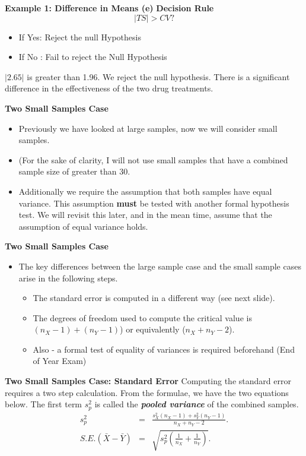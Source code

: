 \documentclass[a4]{beamer}
\begin{document}
\noindent \textbf{Example 1: Difference in Means (e) }
\textbf{Decision Rule}
\[ |TS| > CV ?  \]
\begin{itemize}
\item If Yes: Reject the null Hypothesis
\item If No : Fail to reject the Null Hypothesis
\end{itemize}
$|2.65|$ is greater than 1.96. We reject the null hypothesis. There is a significant difference in the effectiveness of the two drug treatments.






\noindent \textbf{Two Small Samples Case}
\begin{itemize}
\item Previously we have looked at large samples, now we will consider small samples.
\item (For the sake of clarity, I will not use small samples that have a combined sample size of greater than 30.
\item Additionally we require the assumption that both samples have equal variance. This assumption \textbf{must} be tested with another formal hypothesis test. We will revisit this later, and in the mean time, assume that the assumption of equal variance holds.
\end{itemize}



\noindent \textbf{Two Small Samples Case}
\begin{itemize}
\item The key differences between the large sample case and the small sample cases arise in the following steps.
    \begin{itemize}
    \item The standard error is computed in a different way (see next slide).
    \item The degrees of freedom used to compute the critical value is $(n_X-1) + (n_Y - 1)$) or equivalently ($n_X + n_Y - 2$).
    \item Also - a formal test of equality of variances is required beforehand (End of Year Exam)
    \end{itemize}
\end{itemize}


\noindent \textbf{Two Small Samples Case: Standard Error}
Computing the standard error requires a two step calculation. From the formulae, we have the two equations below. The first term $s_p^2$ is called the \textbf{\textit{pooled variance}} of the combined samples.
\begin{eqnarray*}
s_p^2&=&\frac{s_X^2(n_X-1)+s_Y^2(n_Y-1)}{n_X+n_Y-2}.\\
S.E.(\bar{X}-\bar{Y})&=&\sqrt{s_p^2\left(\frac{1}{n_X}+\frac{1}{n_Y}\right)}.\\
\end{eqnarray*}
\end{document}
